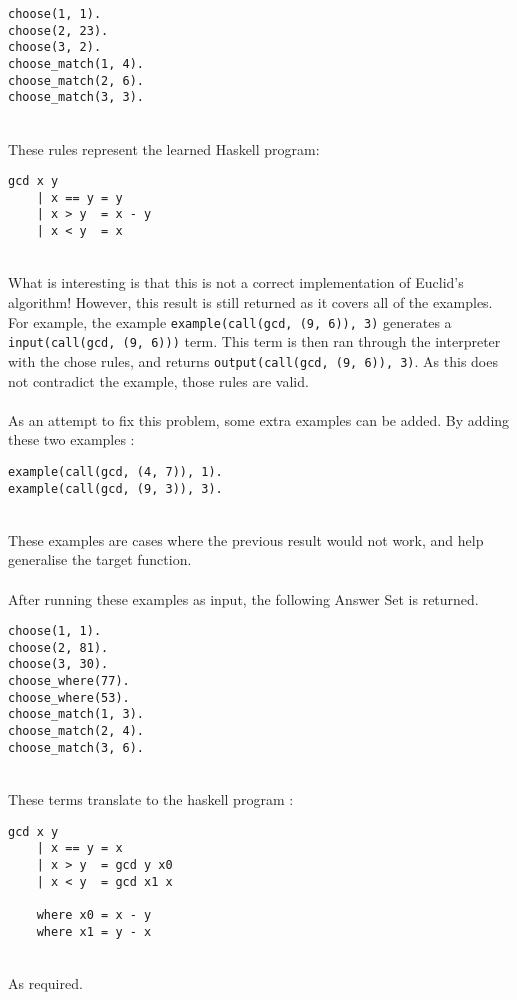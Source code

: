\begin{multicols}{2}
\begin{lstlisting}
choose(1, 1).
choose(2, 23).
choose(3, 2).
choose_match(1, 4).
choose_match(2, 6).
choose_match(3, 3).
\end{lstlisting}
\end{multicols}
\mbox{}\\
These rules represent the learned Haskell program: \\

\begin{lstlisting}
gcd x y
	| x == y = y
	| x > y  = x - y
	| x < y  = x
\end{lstlisting}
\mbox{}\\
What is interesting is that this is not a correct implementation of Euclid's algorithm! However, this result is still returned as it covers all of the examples. For example, the example \lstinline{example(call(gcd, (9, 6)), 3)} generates a \lstinline{input(call(gcd, (9, 6)))} term. This term is then ran through the interpreter with the chose rules, and returns \lstinline{output(call(gcd, (9, 6)), 3)}. As this does not contradict the example, those rules are valid. \\ \\%
As an attempt to fix this problem, some extra examples can be added. By adding these two examples :\\

\begin{lstlisting}
example(call(gcd, (4, 7)), 1).
example(call(gcd, (9, 3)), 3).
\end{lstlisting}
\mbox{}\\
These examples are cases where the previous result would not work, and help generalise the target function. \\ \\
After running these examples as input, the following Answer Set is returned. \\

\begin{lstlisting}
choose(1, 1).
choose(2, 81).
choose(3, 30).
choose_where(77).
choose_where(53).
choose_match(1, 3).
choose_match(2, 4).
choose_match(3, 6).
\end{lstlisting}
\mbox{} \\
These terms translate to the haskell program :

\begin{lstlisting}
gcd x y
	| x == y = x
	| x > y  = gcd y x0
	| x < y  = gcd x1 x
	
	where x0 = x - y
	where x1 = y - x
\end{lstlisting}
\mbox{}\\
As required.

